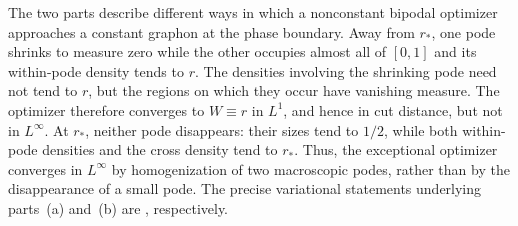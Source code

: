 The two parts describe different ways in which a
nonconstant bipodal optimizer approaches a constant graphon at the phase
boundary.  Away from $r_*$, one pode shrinks to measure zero while the other
occupies almost all of $[0,1]$ and its within-pode density tends to $r$.  The
densities involving the shrinking pode need not tend to $r$, but the regions
on which they occur have vanishing measure.  The optimizer therefore converges
to $W\equiv r$ in $L^1$, and hence in cut distance, but not in
$L^\infty$.  At $r_*$, neither pode disappears: their sizes tend to $1/2$, while
both within-pode densities and the cross density tend to $r_*$.  Thus, the
exceptional optimizer converges in $L^\infty$ by homogenization of two
macroscopic podes, rather than by the disappearance of a small pode.
The precise variational statements underlying parts~(a) and~(b) are
, respectively.

